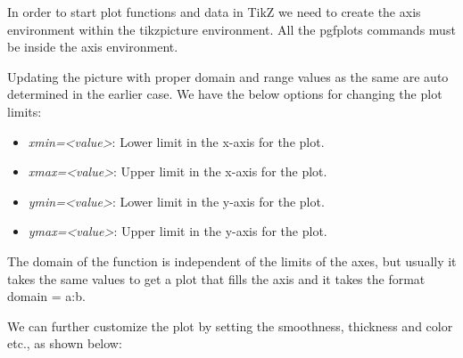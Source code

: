 \documentclass[12]{article}
\begin{document}
    In order to start plot functions and data in \textrm{TikZ} we need to create the axis environment within the \textsf{tikzpicture} environment. All the \textsf{pgfplots} commands must be inside the axis environment.


    Updating the picture with proper domain and range values as the same are auto determined in the earlier case. We have the below options for changing the plot limits:

    \begin{itemize}
        \item \textit{xmin=<value>}: Lower limit in the x-axis for the plot.
        \item \textit{xmax=<value>}: Upper limit in the x-axis for the plot.
        \item \textit{ymin=<value>}: Lower limit in the y-axis for the plot.
        \item \textit{ymax=<value>}: Upper limit in the y-axis for the plot.
    \end{itemize}

    The domain of the function is independent of the limits of the axes, but usually it takes the same values to get a plot that fills the axis and it takes the format \textsf{domain = a:b}.


    We can further customize the plot by setting the smoothness, thickness and color etc., as shown below:
\end{document}

